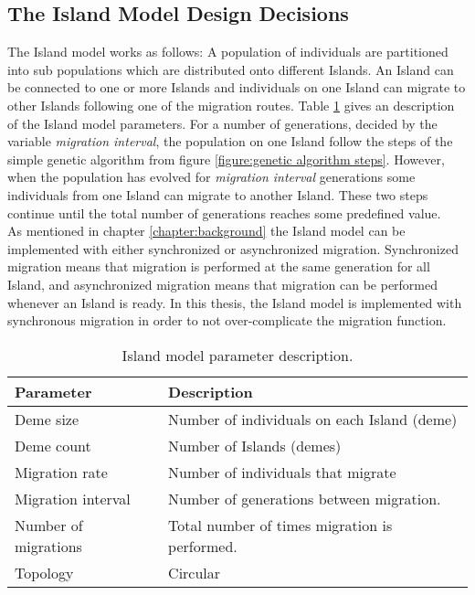 \subsection{The Island Model Design Decisions}


\noindent The Island model works as follows: A population of individuals are partitioned into sub populations which are distributed onto different Islands. An Island can be connected to one or more Islands and individuals on one Island can migrate to other Islands following one of the migration routes. Table \ref{table:parameter description island model} gives an description of the Island model parameters. For a number of generations, decided by the variable \textit{migration interval}, the population on one Island follow the steps of the simple genetic algorithm from figure \ref{figure:genetic algorithm steps}. However, when the population has evolved for \textit{migration interval} generations some individuals from one Island can migrate to another Island. These two steps continue until the total number of generations reaches some predefined value.\\


\noindent As mentioned in chapter \ref{chapter:background} the Island model can be implemented with either synchronized or asynchronized migration. Synchronized migration means that migration is performed at the same generation for all Island, and asynchronized migration means that migration can be performed whenever an Island is ready. In this thesis, the Island model is implemented with synchronous migration in order to not over-complicate the migration function.\\


\begin{table}[h!]
    \centering
    \caption{Island model parameter description.}
    \label{table:parameter description island model}
        \begin{tabular}{l|l}
         \textbf{Parameter} & \textbf{Description}  \\
         \hline
         Deme size  & Number of individuals on each Island (deme) \\
         Deme count & Number of Islands (demes) \\
         Migration rate & Number of individuals that migrate \\
         Migration interval & Number of generations between migration. \\
         Number of migrations & Total number of times migration is performed. \\
         Topology & Circular
    \end{tabular}
\end{table}


